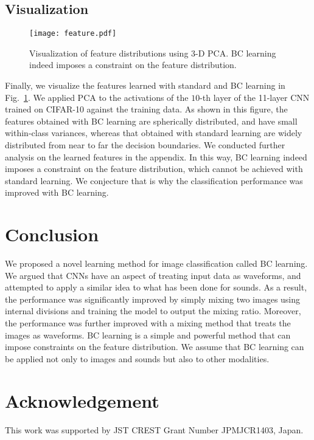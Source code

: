 \documentclass[10pt,twocolumn,letterpaper]{article}
\begin{document}
\subsection{Visualization}
\begin{figure}
	\centering
	\vspace{-3mm}
	\texttt{[image: feature.pdf]}
	\vspace{-1mm}
	\caption{Visualization of feature distributions using $3$-D PCA. BC learning indeed imposes a constraint on the feature distribution.}
	\label{fig:feature}
	\vspace{-3mm}
\end{figure}

Finally, we visualize the features learned with standard and BC learning in Fig.~\ref{fig:feature}. We applied PCA to the activations of the $10$-th layer of the 11-layer CNN trained on CIFAR-10 against the training data. As shown in this figure, the features obtained with BC learning are spherically distributed, and have small within-class variances, whereas that obtained with standard learning are widely distributed from near to far the decision boundaries. We conducted further analysis on the learned features in the appendix. In this way, BC learning indeed imposes a constraint on the feature distribution, which cannot be achieved with standard learning. We conjecture that is why the classification performance was improved with BC learning.



\section{Conclusion}\label{5}
We proposed a novel learning method for image classification called BC learning. We argued that CNNs have an aspect of treating input data as waveforms, and attempted to apply a similar idea to what has been done for sounds. As a result, the performance was significantly improved by simply mixing two images using internal divisions and training the model to output the mixing ratio. Moreover, the performance was further improved with a mixing method that treats the images as waveforms. BC learning is a simple and powerful method that can impose constraints on the feature distribution. We assume that BC learning can be applied not only to images and sounds but also to other modalities.

\section*{Acknowledgement}
This work was supported by JST CREST Grant Number JPMJCR1403, Japan.
\end{document}
